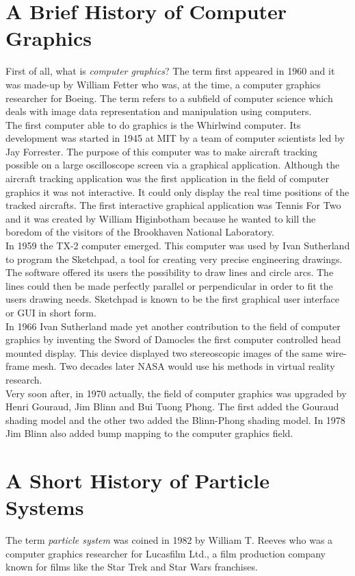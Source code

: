 \section{A Brief History of Computer Graphics}
First of all, what is \textit{computer graphics}? The term first appeared in 1960 and it was made-up by William Fetter who was, at the time, a computer graphics researcher for Boeing. The term refers to a subfield of computer science which deals with image data representation and manipulation using computers.\\

The first computer able to do graphics is the Whirlwind computer. Its development was started in 1945 at MIT by a team of computer scientists led by Jay Forrester. The purpose of this computer was to make aircraft tracking possible on a large oscilloscope screen via a graphical application. Although the aircraft tracking application was the first application in the field of computer graphics it was not interactive. It could only display the real time positions of the tracked aircrafts. The first interactive graphical application was Tennis For Two and it was created by William Higinbotham because he wanted to kill the boredom of the visitors of the Brookhaven National Laboratory.\\

In 1959 the TX-2 computer emerged. This computer was used by Ivan Sutherland to program the Sketchpad, a tool for creating very precise engineering drawings. The software offered its users the possibility to draw lines and circle arcs. The lines could then be made perfectly parallel or perpendicular in order to fit the users drawing needs. Sketchpad is known to be the first graphical user interface or GUI in short form.\\

In 1966 Ivan Sutherland made yet another contribution to the field of computer graphics by inventing the Sword of Damocles the first computer controlled head mounted display. This device displayed two stereoscopic images of the same wire-frame mesh. Two decades later NASA would use his methods in virtual reality research.\\

Very soon after, in 1970 actually, the field of computer graphics was upgraded by Henri Gouraud, Jim Blinn and Bui Tuong Phong. The first added the Gouraud shading model and the other two added the Blinn-Phong shading model. In 1978 Jim Blinn also added bump mapping to the computer graphics field.
\section{A Short History of Particle Systems}
The term \textit{particle system} was coined in 1982 by William T. Reeves who was a computer graphics researcher for Lucasfilm Ltd., a film production company known for films like the Star Trek and Star Wars franchises.\\

